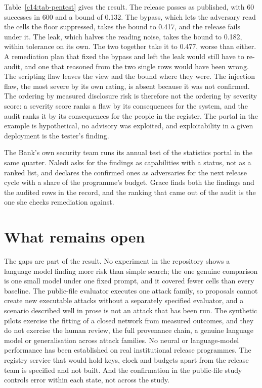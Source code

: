 Table~\ref{c14:tab-pentest} gives the result. The release passes as published, with 60
successes in 600 and a bound of 0.132. The bypass, which lets the adversary read the
cells the floor suppressed, takes the bound to 0.417, and the release fails under it.
The leak, which halves the reading noise, takes the bound to 0.182, within tolerance
on its own. The two together take it to 0.477, worse than either. A remediation plan
that fixed the bypass and left the leak would still have to re-audit, and one that
reasoned from the two single rows would have been wrong. The scripting flaw leaves the
view and the bound where they were. The injection flaw, the most severe by its own
rating, is absent because it was not confirmed.
The ordering by measured disclosure risk is therefore not the ordering by severity
score: a severity score ranks a flaw by its consequences for the system, and the audit
ranks it by its consequences for the people in the register. The portal in the example
is hypothetical, no advisory was exploited, and exploitability in a given deployment is
the tester's finding.

The Bank's own security team runs its annual test of the statistics portal in the same
quarter. Naledi asks for the findings as capabilities with a status, not as a ranked
list, and declares the confirmed ones as adversaries for the next release cycle with a
share of the programme's budget. Grace finds both the findings and the audited rows in
the record, and the ranking that came out of the audit is the one she checks
remediation against.

\section{What remains open}\label{c14:sec-open}

The gaps are part of the result. No experiment in the repository shows a language model
finding more risk than simple search; the one genuine comparison is one small model
under one fixed prompt, and it covered fewer cells than every baseline. The public-file
evaluator executes one attack family, so proposals cannot create new executable attacks
without a separately specified evaluator, and a scenario described well in prose is not
an attack that has been run. The synthetic pilots exercise the fitting of a closed
network from measured outcomes, and they do not exercise the human review, the full
provenance chain, a genuine language model or generalisation across attack families. No
neural or language-model performance has been established on real institutional release
programmes. The registry service that would hold keys, clock and budgets apart from the
release team is specified and not built. And the confirmation in the public-file study
controls error within each state, not across the study.

